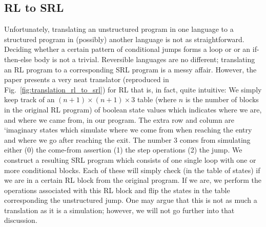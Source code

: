 \subsection{RL to SRL}

Unfortunately, translating an unstructured program in one language to a structured program in (possibly) another language is not as straightforward. Deciding whether a certain pattern of conditional jumps forms a loop or or an if-then-else body is not a trivial. Reversible languages are no different; translating an RL program to a corresponding SRL program is a messy affair. However, the paper \cite[Fig.~22]{REV} presents a very neat translator (reproduced in Fig.~\ref{fig:translation_rl_to_srl}) for RL that is, in fact, quite intuitive: We simply keep track of an $(n+1) \times (n+1) \times 3$ table (where $n$ is the number of blocks in the original RL program) of boolean state values which indicates where we are, and where we came from, in our program. The extra row and column are `imaginary states which simulate where we come from when reaching the entry and where we go after reaching the exit. The number $3$ comes from simulating either (0) the come-from assertion (1) the step operations (2) the jump. We construct a resulting SRL program which consists of one single loop with one or more conditional blocks. Each of these will simply check (in the table of states) if we are in a certain RL block from the original program. If we are, we perform the operations associated with this RL block and flip the states in the table corresponding the unstructured jump. One may argue that this is not as much a translation as it is a simulation; however, we will not go further into that discussion.
